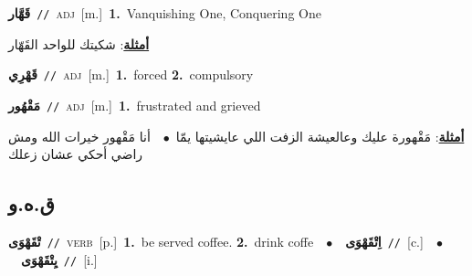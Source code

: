 \documentclass[10pt,a4paper,twoside]{article} %
\begin{document}
\begin{multicols}{2}
{\setlength\topsep{0pt}\textbf{\foreignlanguage{arabic}{قَهَّار}}\ {\color{gray}\texttt{//}\color{black}}\ \textsc{adj}\ [m.]\ \textbf{1.}~Vanquishing One, Conquering One\  \begin{flushright}\color{gray}\foreignlanguage{arabic}{\textbf{\underline{\foreignlanguage{arabic}{أمثلة}}}: شكيتك للواحد القَهّار}\end{flushright}\color{black}} \vspace{2mm}

{\setlength\topsep{0pt}\textbf{\foreignlanguage{arabic}{قَهْرِي}}\ {\color{gray}\texttt{//}\color{black}}\ \textsc{adj}\ [m.]\ \textbf{1.}~forced  \textbf{2.}~compulsory\ } \vspace{2mm}

{\setlength\topsep{0pt}\textbf{\foreignlanguage{arabic}{مَقْهُور}}\ {\color{gray}\texttt{//}\color{black}}\ \textsc{adj}\ [m.]\ \textbf{1.}~frustrated and grieved\  \begin{flushright}\color{gray}\foreignlanguage{arabic}{\textbf{\underline{\foreignlanguage{arabic}{أمثلة}}}: مَقْهورة عليك وعالعيشة الزفت اللي عايشيتها يمّا\ $\bullet$\ \  أنا مَقْهور خيرات الله ومش راضي أحكي عشان زعلك}\end{flushright}\color{black}} \vspace{2mm}

\vspace{-3mm}
\subsection*{\color{blue}\foreignlanguage{arabic}{ق.ه.و}\color{blue}{}} 

{\setlength\topsep{0pt}\textbf{\foreignlanguage{arabic}{تْقَهْوَى}}\ {\color{gray}\texttt{//}\color{black}}\ \textsc{verb}\ [p.]\ \textbf{1.}~be served coffee.  \textbf{2.}~drink coffe\ \ $\bullet$\ \ \setlength\topsep{0pt}\textbf{\foreignlanguage{arabic}{اِتْقَهْوَى}}\ {\color{gray}\texttt{//}\color{black}}\ [c.]\ \ $\bullet$\ \ \setlength\topsep{0pt}\textbf{\foreignlanguage{arabic}{يِتْقَهْوَى}}\ {\color{gray}\texttt{//}\color{black}}\ [i.]\ } \vspace{2mm}


\end{multicols}
\end{document}
